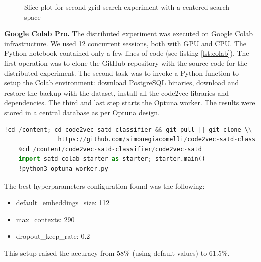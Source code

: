 \begin{figure}
 \centering
 \caption[]{Slice plot for second grid search experiment with a centered search space}
    \label{fig:optuna_second}
\end{figure}



\textbf{Google Colab Pro.} The distributed experiment was executed on Google Colab infrastructure. We used 12 concurrent sessions, both with GPU and CPU. The Python notebook contained only a few lines of code (see listing \ref{lst:colab}). The first operation was to clone the GitHub repository with the source code for the distributed experiment. The second task was to invoke a Python function to setup the Colab environment: download PostgreSQL binaries, download and restore the backup with the dataset, install all the code2vec libraries and dependencies. The third and last step starts the Optuna worker. The results were stored in a central database as per Optuna design.

\begin{lstlisting}[caption={Google Colab notebook code}, label={lst:colab},language=Python]
    !cd /content; cd code2vec-satd-classifier && git pull || git clone \\
               https://github.com/simonegiacomelli/code2vec-satd-classifier
    %cd /content/code2vec-satd-classifier/code2vec-satd
    import satd_colab_starter as starter; starter.main()
    !python3 optuna_worker.py

\end{lstlisting}


\noindent The best hyperparameters configuration found was the following:
\begin{itemize}
    \item default\_embeddings\_size: 112
    \item max\_contexts: 290
    \item dropout\_keep\_rate: 0.2
\end{itemize}
This setup raised the accuracy from 58\% (using default values) to 61.5\%.

